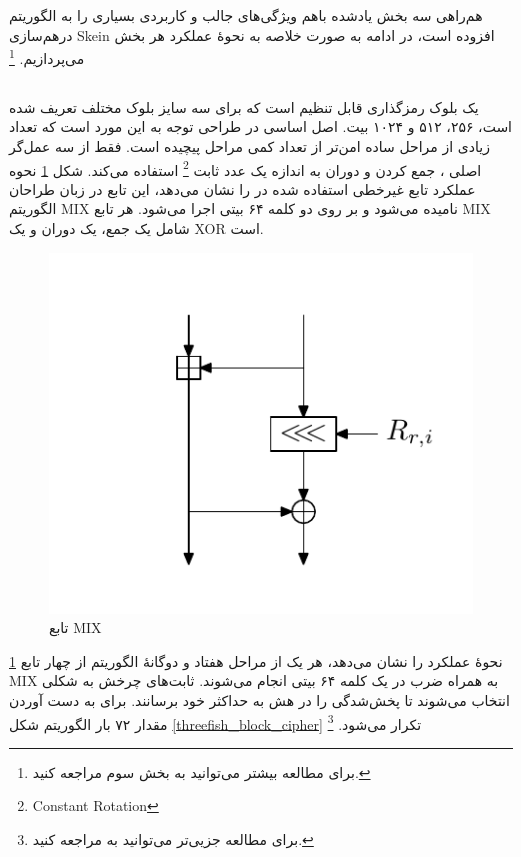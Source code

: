 هم‌راهی سه بخش یادشده باهم ویژگی‌های جالب و کاربردی بسیاری را به الگوریتم درهم‌سازی 
Skein 
افزوده است، در ادامه به صورت خلاصه به نحوهٔ عملکرد هر بخش می‌پردازیم.
\footnote{برای مطالعه بیشتر می‌توانید به بخش سوم 
\cite{main_doc} مراجعه کنید. }


\subsection{}
یک بلوک رمزگذاری قابل تنظیم است که برای سه سایز بلوک مختلف تعریف شده است، ۲۵۶، ۵۱۲ و ۱۰۲۴ بیت. 
اصل اساسی در طراحی 
توجه به این مورد است که تعداد زیادی از مراحل ساده امن‌تر از تعداد کمی مراحل پیچیده است.
فقط از سه عمل‌گر اصلی 
، جمع کردن و دوران به اندازه یک عدد ثابت
\footnote{Constant Rotation}
استفاده می‌کند. 
شکل 
\ref{threefish_mix_function}
نحوه عملکرد تابع غیرخطی استفاده شده در 
را نشان می‌دهد، این تابع در زبان طراحان الگوریتم 
MIX
نامیده می‌شود و بر روی دو کلمه ۶۴ بیتی اجرا می‌شود. هر تابع 
MIX
شامل یک جمع، یک دوران و یک 
XOR
است. 
\begin{figure}
\centering
\includegraphics[scale=0.7]{figs/threefish_mix_function.png}
\caption{تابع MIX}
\label{threefish_mix_function}
\end{figure}

\ref{threefish_mix_function}
 نحوهٔ عملکرد 
 را نشان می‌دهد، هر یک از مراحل هفتاد و دوگانهٔ الگوریتم
 از چهار تابع MIX
 به همراه ضرب در یک کلمه ۶۴ بیتی انجام می‌شوند. ثابت‌های چرخش به شکلی انتخاب می‌شوند تا پخش‌شدگی را در هش به حداکثر خود برسانند. 
 برای به دست آوردن مقدار 
۷۲ بار الگوریتم شکل
\ref{threefish_block_cipher}
تکرار می‌شود.
\footnote{برای مطالعه جزیی‌تر می‌توانید به 
\cite{main_doc}
مراجعه کنید.}

